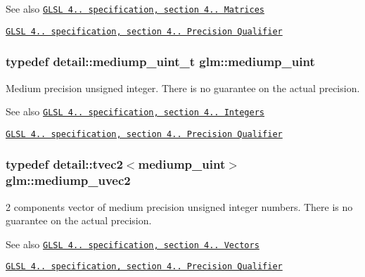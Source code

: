 \begin{DoxySeeAlso}{See also}
\href{http://www.opengl.org/registry/doc/GLSLangSpec.4.20.8.pdf}{\tt G\+L\+S\+L 4.. specification, section 4.. Matrices} 

\href{http://www.opengl.org/registry/doc/GLSLangSpec.4.20.8.pdf}{\tt G\+L\+S\+L 4.. specification, section 4.. Precision Qualifier} 
\end{DoxySeeAlso}
\hypertarget{group__core__precision_ga08ae38ad78ade3539fdd1d25052b8c51}{}
\subsubsection[{mediump\+\_\+uint}]{\setlength{\rightskip}{0pt plus 5cm}typedef detail\+::mediump\+\_\+uint\+\_\+t {\bf glm\+::mediump\+\_\+uint}}\label{group__core__precision_ga08ae38ad78ade3539fdd1d25052b8c51}
Medium precision unsigned integer. There is no guarantee on the actual precision.

\begin{DoxySeeAlso}{See also}
\href{http://www.opengl.org/registry/doc/GLSLangSpec.4.20.8.pdf}{\tt G\+L\+S\+L 4.. specification, section 4.. Integers} 

\href{http://www.opengl.org/registry/doc/GLSLangSpec.4.20.8.pdf}{\tt G\+L\+S\+L 4.. specification, section 4.. Precision Qualifier} 
\end{DoxySeeAlso}
\hypertarget{group__core__precision_ga95f22fddbbb9561e648aaa2a461be59c}{}
\subsubsection[{mediump\+\_\+uvec2}]{\setlength{\rightskip}{0pt plus 5cm}typedef detail\+::tvec2$<$mediump\+\_\+uint$>$ {\bf glm\+::mediump\+\_\+uvec2}}\label{group__core__precision_ga95f22fddbbb9561e648aaa2a461be59c}
2 components vector of medium precision unsigned integer numbers. There is no guarantee on the actual precision.

\begin{DoxySeeAlso}{See also}
\href{http://www.opengl.org/registry/doc/GLSLangSpec.4.20.8.pdf}{\tt G\+L\+S\+L 4.. specification, section 4.. Vectors} 

\href{http://www.opengl.org/registry/doc/GLSLangSpec.4.20.8.pdf}{\tt G\+L\+S\+L 4.. specification, section 4.. Precision Qualifier} 
\end{DoxySeeAlso}
\hypertarget{group__core__precision_gaa69cb8ff23d5c3daa3cf320136ac8e7d}{}
